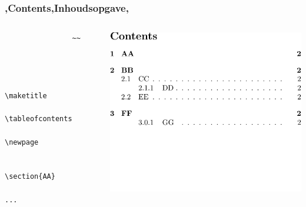 \begin{frame}[fragile]
    \frametitle{\lang,Contents,Inhoudsopgave,}
    
    \begin{columns}
        \begin{column}{0.5\textwidth}
            \begin{verbatim}
                ~~

                
                
                    \maketitle
                    \tableofcontents
                    \newpage
                    
                    \section{AA}
                    ...
                
            \end{verbatim}
        \end{column}
        \begin{column}{0.5\textwidth}
            \includegraphics[width=\linewidth,height=0.8\textheight,keepaspectratio,page=1]{assets/tableofcontentswholepage.pdf}
        \end{column}
    \end{columns}
\end{frame}

